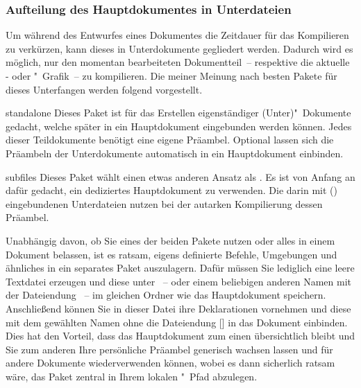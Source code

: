 \subsubsection{Aufteilung des Hauptdokumentes in Unterdateien}
%
Um während des Entwurfes eines Dokumentes die Zeitdauer für das Kompilieren zu 
verkürzen, kann dieses in Unterdokumente gegliedert werden. Dadurch wird es 
möglich, nur den momentan bearbeiteten Dokumentteil~-- respektive die aktuelle 
- oder "~Grafik~-- zu kompilieren. Die meiner 
Meinung nach besten Pakete für dieses Unterfangen werden folgend vorgestellt.
%
\begin{packages}
\item[standalone]
  Dieses Paket ist für das Erstellen eigenständiger (Unter)"~Dokumente gedacht, 
  welche später in ein Hauptdokument eingebunden werden können. Jedes dieser 
  Teildokumente benötigt eine eigene Präambel. Optional lassen sich die 
  Präambeln der Unterdokumente automatisch in ein Hauptdokument einbinden.
\item[subfiles]
%
  Dieses Paket wählt einen etwas anderen Ansatz als . Es 
  ist von Anfang an dafür gedacht, ein dediziertes Hauptdokument zu verwenden. 
  Die darin mit () eingebundenen Unterdateien 
  nutzen bei der autarken Kompilierung dessen Präambel.
\end{packages}
%
Unabhängig davon, ob Sie eines der beiden Pakete nutzen oder alles in einem 
Dokument belassen, ist es ratsam, eigens definierte Befehle, Umgebungen und 
ähnliches in ein separates Paket auszulagern. Dafür müssen Sie lediglich eine 
leere Textdatei erzeugen und diese unter ~-- oder einem 
beliebigen anderen Namen mit der Dateiendung ~-- im gleichen Ordner 
wie das Hauptdokument speichern. Anschließend können Sie in dieser Datei ihre 
Deklarationen vornehmen und diese mit dem gewählten Namen ohne die Dateiendung
[] in das Dokument einbinden. Dies hat 
den Vorteil, dass das Hauptdokument zum einen übersichtlich bleibt und Sie zum 
anderen Ihre persönliche Präambel generisch wachsen lassen und für andere 
Dokumente wiederverwenden können, wobei es dann sicherlich ratsam wäre, das 
Paket zentral in Ihrem lokalen "~Pfad abzulegen. 



